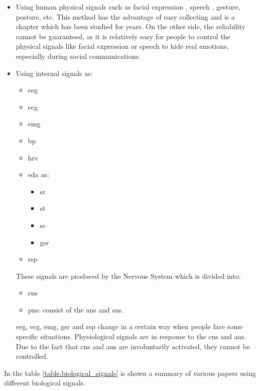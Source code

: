 \begin{itemize}
	\item Using human physical signals such as facial expression \cite{zhang2016facial}, speech \cite{mao2014learning}, gesture, posture, etc. This method has the advantage of easy collecting and is a chapter which has been studied for years. On the other side, the reliability cannot be guaranteed, as it is relatively easy for people to control the physical signals like facial expression or speech to hide real emotions, especially during social communications.
	\item Using internal signals as:
	\begin{itemize}
		\item  \gls{eeg}
		\item \gls{ecg}
		\item \gls{emg}
		\item \gls{bp}
		\item \gls{hrv}
		\item \gls{eda} as:
		\begin{itemize}
			\item \gls{sr}
			\item \gls{st}
			\item \gls{sc}
			\item \gls{gsr}
		\end{itemize}
		\item \gls{rsp}
	\end{itemize}
	These signals are produced by the Nervous System which is divided into:
	\begin{itemize}
		\item \gls{cns}
		\item \gls{pns}: consist of the \gls{ans} and \gls{sns}.
	\end{itemize}
	\gls{eeg}, \gls{ecg}, \gls{emg}, \gls{gsr} and \gls{rsp} change in a certain way when people face some specific situations. Physiological signals are in response to the \gls{cns} and \gls{ans}. Due to the fact that \gls{cns} and \gls{ans} are involuntarily activated, they cannot be controlled.
\end{itemize}
In the table \ref{table:biological_signals} is shown a summary of various papers using different biological signals.
